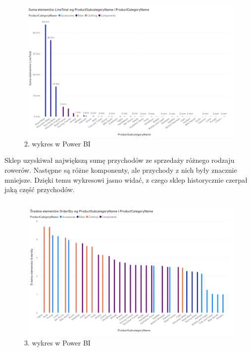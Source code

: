 \documentclass[a4paper,12pt]{article}
\begin{document}
\subsubsection{}

\begin{figure}[H]
    \centering
    \includegraphics[width=1.0\textwidth]{images/power_bi/02.png}
    \caption{2. wykres w Power BI}
\end{figure}

Sklep uzyskiwał największą sumę przychodów ze sprzedaży różnego rodzaju rowerów. Następne są różne komponenty, ale przychody z nich były znacznie mniejsze. Dzięki temu wykresowi jasno widać, z czego sklep historycznie czerpał jaką część przychodów.

\subsubsection{}

\begin{figure}[H]
    \centering
    \includegraphics[width=1.0\textwidth]{images/power_bi/03.png}
    \caption{3. wykres w Power BI}
\end{figure}
\end{document}
